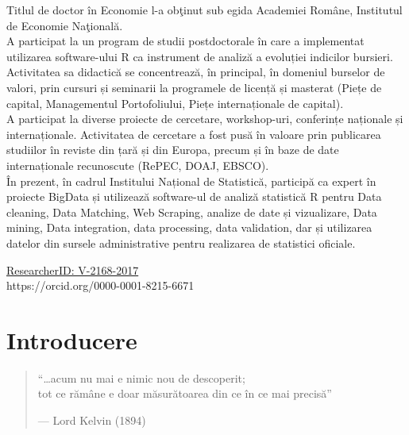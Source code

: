 \documentclass[
  11pt,
  b5paper,
  nottoc]{book}
\begin{document}
Titlul de doctor în Economie l-a obţinut sub egida Academiei Române,
Institutul de Economie Naţională.\\
A participat la un program de studii postdoctorale în care a implementat
utilizarea software-ului R ca instrument de analiză a evoluției
indicilor bursieri.\\
Activitatea sa didactică se concentrează, în principal, în domeniul
burselor de valori, prin cursuri și seminarii la programele de licență
și masterat (Piețe de capital, Managementul Portofoliului, Piețe
internaționale de capital).\\
A participat la diverse proiecte de cercetare, workshop-uri, conferințe
naționale și internaționale. Activitatea de cercetare a fost pusă în
valoare prin publicarea studiilor în reviste din țară și din Europa,
precum și în baze de date internaționale recunoscute (RePEC, DOAJ,
EBSCO).\\
În prezent, în cadrul Institului Național de Statistică, participă ca
expert în proiecte BigData și utilizează software-ul de analiză
statistică R pentru Data cleaning, Data Matching, Web Scraping, analize
de date și vizualizare, Data mining, Data integration, data processing,
data validation, dar și utilizarea datelor din sursele administrative
pentru realizarea de statistici oficiale.

\href{http://www.researcherid.com/rid/V-2168-2017}{ResearcherID:
V-2168-2017}\\
https://orcid.org/0000-0001-8215-6671


\hypertarget{introducere}{%
\chapter*{Introducere}\label{introducere}}


\begin{quote}
``\ldots acum nu mai e nimic nou de descoperit;\\
tot ce rămâne e doar măsurătoarea din ce în ce mai precisă''

--- Lord Kelvin (1894)
\end{quote}
\end{document}
